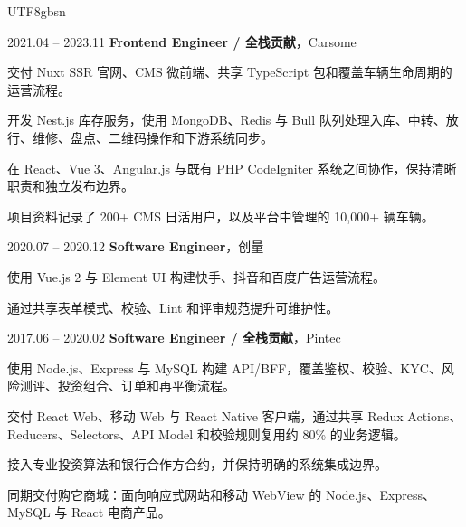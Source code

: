 \documentclass[10pt, letterpaper]{article}
\begin{document}
\begin{CJK*}{UTF8}{gbsn}
        \vspace{0.25 cm}
        \begin{twocolentry}{2021.04 -- 2023.11}
            \textbf{Frontend Engineer / 全栈贡献}，Carsome
        \end{twocolentry}
        \begin{onecolentry}
            \begin{highlights}
                \item 交付 Nuxt SSR 官网、CMS 微前端、共享 TypeScript 包和覆盖车辆生命周期的运营流程。
                \item 开发 Nest.js 库存服务，使用 MongoDB、Redis 与 Bull 队列处理入库、中转、放行、维修、盘点、二维码操作和下游系统同步。
                \item 在 React、Vue 3、Angular.js 与既有 PHP CodeIgniter 系统之间协作，保持清晰职责和独立发布边界。
                \item 项目资料记录了 200+ CMS 日活用户，以及平台中管理的 10,000+ 辆车辆。
            \end{highlights}
        \end{onecolentry}

        \vspace{0.25 cm}
        \begin{twocolentry}{2020.07 -- 2020.12}
            \textbf{Software Engineer}，创量
        \end{twocolentry}
        \begin{onecolentry}
            \begin{highlights}
                \item 使用 Vue.js 2 与 Element UI 构建快手、抖音和百度广告运营流程。
                \item 通过共享表单模式、校验、Lint 和评审规范提升可维护性。
            \end{highlights}
        \end{onecolentry}

        \vspace{0.2 cm}
        \begin{twocolentry}{2017.06 -- 2020.02}
            \textbf{Software Engineer / 全栈贡献}，Pintec
        \end{twocolentry}
        \begin{onecolentry}
            \begin{highlights}
                \item 使用 Node.js、Express 与 MySQL 构建 API/BFF，覆盖鉴权、校验、KYC、风险测评、投资组合、订单和再平衡流程。
                \item 交付 React Web、移动 Web 与 React Native 客户端，通过共享 Redux Actions、Reducers、Selectors、API Model 和校验规则复用约 80\% 的业务逻辑。
                \item 接入专业投资算法和银行合作方合约，并保持明确的系统集成边界。
                \item 同期交付购它商城：面向响应式网站和移动 WebView 的 Node.js、Express、MySQL 与 React 电商产品。
            \end{highlights}
        \end{onecolentry}


\end{CJK*}
\end{document}

